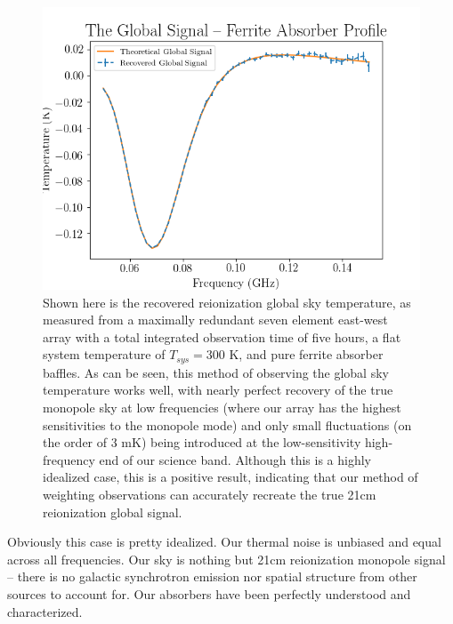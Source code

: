 \begin{figure}
    \begin{center}
    \includegraphics[width=\linewidth]{recovered_signal_same_abs.png}
    \end{center}
    \caption{
        Shown here is the recovered reionization global sky temperature, as 
        measured from a maximally redundant seven element east-west array with 
        a total integrated observation time of five hours, a flat system 
        temperature of $T_{sys} = 300$ K, and pure ferrite absorber baffles. As 
        can be seen, this method of observing the global sky temperature works 
        well, with nearly perfect recovery of the true monopole sky at low 
        frequencies (where our array has the highest sensitivities to the 
        monopole mode) and only small fluctuations (on the order of 3 mK) being 
        introduced at the low-sensitivity high-frequency end of our science 
        band. Although this is a highly idealized case, this is a positive 
        result, indicating that our method of weighting observations can 
        accurately recreate the true 21cm reionization global signal.
    }
    \label{fig:recovered-ferrite}
\end{figure}

Obviously this case is pretty idealized. Our thermal noise is unbiased and 
equal across all frequencies. Our sky is nothing but 21cm reionization monopole 
signal -- there is no galactic synchrotron emission nor spatial structure from 
other sources to account for. Our absorbers have been perfectly understood and 
characterized.

